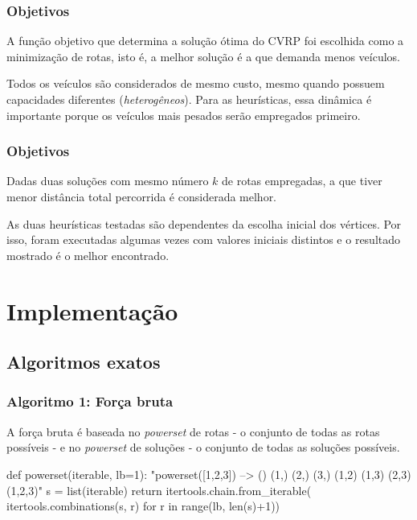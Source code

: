 \documentclass{beamer}
\begin{document}
\begin{frame} %
    \frametitle{Objetivos}

    A função objetivo que determina a solução ótima do CVRP foi escolhida como a minimização de rotas, isto é, a melhor solução é a que demanda menos veículos.

    \bigskip
    Todos os veículos são considerados de mesmo custo, mesmo quando possuem capacidades diferentes (\emph{heterogêneos}). Para as heurísticas, essa dinâmica é importante porque os veículos mais pesados serão empregados primeiro.

\end{frame}

\begin{frame} %
    \frametitle{Objetivos}

    Dadas duas soluções com mesmo número \(k\) de rotas empregadas, a que tiver menor distância total percorrida é considerada melhor.

    \medskip
    As duas heurísticas testadas são dependentes da escolha inicial dos vértices. Por isso, foram executadas algumas vezes com valores iniciais distintos e o resultado mostrado é o melhor encontrado.


\end{frame}

\section{Implementação}

\subsection{Algoritmos exatos}

\begin{frame}[fragile] %
    \frametitle{Algoritmo 1: Força bruta}

    A força bruta é baseada no \emph{powerset} de rotas - o conjunto de todas as rotas possíveis - e no \emph{powerset} de soluções - o conjunto de todas as soluções possíveis.

    \bigskip
    \begin{python}
    def powerset(iterable, lb=1):
        "powerset([1,2,3]) --> () (1,) (2,) (3,) (1,2) 
                               (1,3) (2,3) (1,2,3)"
        s = list(iterable)
        return itertools.chain.from_iterable(
            itertools.combinations(s, r)
            for r in range(lb, len(s)+1))
    \end{python}

\end{frame}
\end{document}
